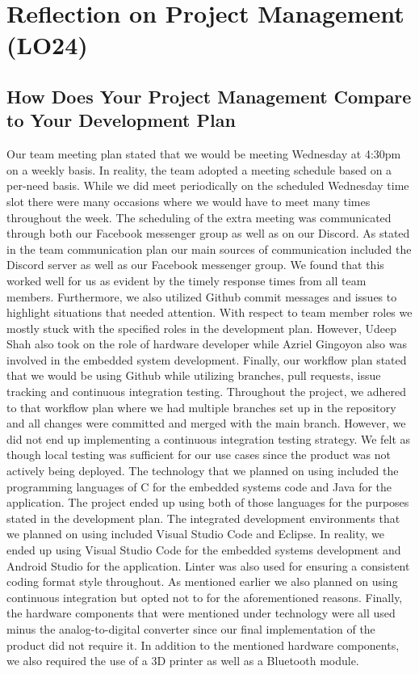 \documentclass{article}
\begin{document}
\section{Reflection on Project Management (LO24)}

\subsection{How Does Your Project Management Compare to Your Development Plan}

Our team meeting plan stated that we would be meeting Wednesday at 4:30pm on a weekly basis. In reality, the team adopted a meeting schedule based on a per-need basis. While we did meet periodically on the scheduled Wednesday time slot there were many occasions where we would have to meet many times throughout the week. The scheduling of the extra meeting was communicated through both our Facebook messenger group as well as on our Discord. As stated in the team communication plan our main sources of communication included the Discord server as well as our Facebook messenger group. We found that this worked well for us as evident by the timely response times from all team members. Furthermore, we also utilized Github commit messages and issues to highlight situations that needed attention. With respect to team member roles we mostly stuck with the specified roles in the development plan. However, Udeep Shah also took on the role of hardware developer while Azriel Gingoyon also was involved in the embedded system development. Finally, our workflow plan stated that we would be using Github while utilizing branches, pull requests, issue tracking and continuous integration testing. Throughout the project, we adhered to that workflow plan where we had multiple branches set up in the repository and all changes were committed and merged with the main branch. However, we did not end up implementing a continuous integration testing strategy. We felt as though local testing was sufficient for our use cases since the product was not actively being deployed.
\newline \newline
The technology that we planned on using included the programming languages of C for the embedded systems code and Java for the application. The project ended up using both of those languages for the purposes stated in the development plan. The integrated development environments that we planned on using included Visual Studio Code and Eclipse. In reality, we ended up using Visual Studio Code for the embedded systems development and Android Studio for the application. Linter was also used for ensuring a consistent coding format style throughout. As mentioned earlier we also planned on using continuous integration but opted not to for the aforementioned reasons. Finally, the hardware components that were mentioned under technology were all used minus the analog-to-digital converter since our final implementation of the product did not require it. In addition to the mentioned hardware components, we also required the use of a 3D printer as well as a Bluetooth module.  
\end{document}
